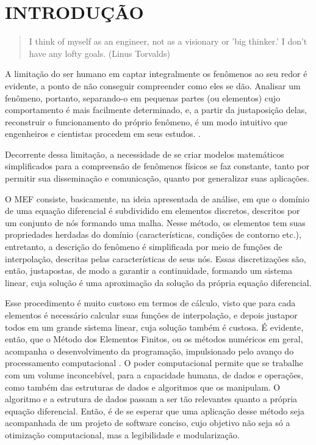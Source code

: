 

\chapter{INTRODUÇÃO}

\begin{quote}
    I think of myself as an engineer, not as a visionary or 'big thinker.' I don't have any lofty goals.
    (Linus Torvalds)  
\end{quote}

A limitação do ser humano em captar integralmente os fenômenos ao seu redor é evidente, a ponto de não conseguir compreender como eles se dão. Analisar um fenômeno, portanto, separando-o em pequenas partes (ou elementos) cujo comportamento é mais facilmente determinado, e, a partir da justaposição delas, reconstruir o funcionamento do próprio fenômeno, é um modo intuitivo que engenheiros e cientistas procedem em seus estudos. \cite[p. 2]{Zin}.

Decorrente dessa limitação, a necessidade de se criar modelos matemáticos simplificados para a compreensão de fenômenos físicos se faz constante, tanto por permitir sua disseminação e comunicação, quanto por generalizar suas aplicações. 

O MEF consiste, basicamente, na ideia apresentada de análise, em que o domínio de uma equação diferencial é subdividido em elementos discretos, descritos por um conjunto de nós formando uma malha. Nesse método, os elementos tem suas propriedades herdadas do domínio (características, condições de contorno etc.), entretanto, a descrição do fenômeno é simplificada por meio de funções de interpolação, descritas pelas características de seus nós. Essas discretizações são, então, justapostas, de modo a garantir a continuidade, formando um sistema linear, cuja solução é uma aproximação da solução da própria equação diferencial. 

Esse procedimento é muito custoso em termos de cálculo, visto que para cada elementos é necessário calcular suas funções de interpolação, e depois justapor todos em um grande sistema linear, cuja solução também é custosa. É evidente, então, que o Método dos Elementos Finitos, ou os métodos numéricos em geral, acompanha o desenvolvimento da programação, impulsionado pelo avanço do processamento computacional \cite{Onate}. O poder computacional permite que se trabalhe com um volume inconcebível, para a capacidade humana, de dados e operações, como também das estruturas de dados e algoritmos que os manipulam. O algoritmo e a estrutura de dados passam a ser tão relevantes quanto a própria equação diferencial. Então, é de se esperar que uma aplicação desse método seja acompanhada de um projeto de software conciso, cujo objetivo não seja só a otimização computacional, mas a legibilidade e modularização.

